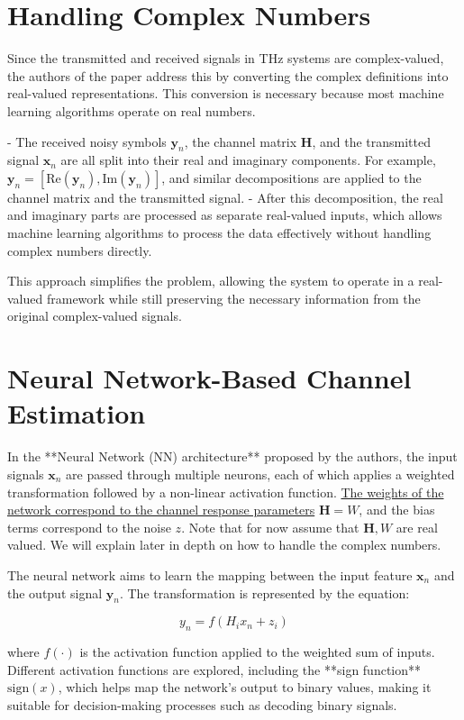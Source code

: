 \documentclass{article}
\begin{document}
\section{Handling Complex Numbers}

Since the transmitted and received signals in THz systems are complex-valued, the authors of the paper address this by converting the complex definitions into real-valued representations. This conversion is necessary because most machine learning algorithms operate on real numbers.

- The received noisy symbols \( \mathbf{y}_n \), the channel matrix \( \mathbf{H} \), and the transmitted signal \( \mathbf{x}_n \) are all split into their real and imaginary components. For example, \( \mathbf{y}_n = [\text{Re}(\mathbf{y}_n), \text{Im}(\mathbf{y}_n)] \), and similar decompositions are applied to the channel matrix and the transmitted signal.
- After this decomposition, the real and imaginary parts are processed as separate real-valued inputs, which allows machine learning algorithms to process the data effectively without handling complex numbers directly.

This approach simplifies the problem, allowing the system to operate in a real-valued framework while still preserving the necessary information from the original complex-valued signals.

\section{Neural Network-Based Channel Estimation}

In the **Neural Network (NN) architecture** proposed by the authors, the input signals \( \mathbf{x}_n \) are passed through multiple neurons, each of which applies a weighted transformation followed by a non-linear activation function. \underline{The weights of the} \underline{network correspond to the channel response parameters} \( \mathbf{H} = W \), and the bias terms correspond to the noise \( z \). Note that for now assume that $\mathbf{H}, W$ are real valued. We will explain later in depth on how to handle the complex numbers.

The neural network aims to learn the mapping between the input feature \( \mathbf{x}_n \) and the output signal \( \mathbf{y}_n \). The transformation is represented by the equation:

\[
y_n = f(H_i x_n + z_i)
\]

where \( f(\cdot) \) is the activation function applied to the weighted sum of inputs. Different activation functions are explored, including the **sign function** \( \text{sign}(x) \), which helps map the network's output to binary values, making it suitable for decision-making processes such as decoding binary signals.
\end{document}
